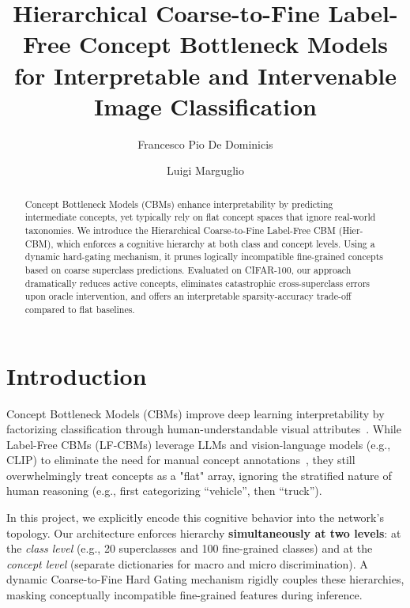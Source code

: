 \documentclass[sigconf, nonacm]{acmart}
\begin{document}
\title{Hierarchical Coarse-to-Fine Label-Free Concept Bottleneck Models for Interpretable and Intervenable Image Classification}

\author{Francesco Pio De Dominicis}

\author{Luigi Marguglio}

\begin{abstract}
Concept Bottleneck Models (CBMs) enhance interpretability by predicting intermediate concepts, yet typically rely on flat concept spaces that ignore real-world taxonomies. We introduce the Hierarchical Coarse-to-Fine Label-Free CBM (Hier-CBM), which enforces a cognitive hierarchy at both class and concept levels. Using a dynamic hard-gating mechanism, it prunes logically incompatible fine-grained concepts based on coarse superclass predictions. Evaluated on CIFAR-100, our approach dramatically reduces active concepts, eliminates catastrophic cross-superclass errors upon oracle intervention, and offers an interpretable sparsity-accuracy trade-off compared to flat baselines.
\end{abstract}

\maketitle

\section{Introduction}
Concept Bottleneck Models (CBMs) improve deep learning interpretability by factorizing classification through human-understandable visual attributes~\cite{Poeta_2023}. While Label-Free CBMs (LF-CBMs) leverage LLMs and vision-language models (e.g., CLIP) to eliminate the need for manual concept annotations~\cite{Wang_2023, Pastor_2026_tutorial}, they still overwhelmingly treat concepts as a "flat" array, ignoring the stratified nature of human reasoning (e.g., first categorizing ``vehicle'', then ``truck'').

In this project, we explicitly encode this cognitive behavior into the network's topology. Our architecture enforces hierarchy \textbf{simultaneously at two levels}: at the \textit{class level} (e.g., 20 superclasses and 100 fine-grained classes) and at the \textit{concept level} (separate dictionaries for macro and micro discrimination). A dynamic Coarse-to-Fine Hard Gating mechanism rigidly couples these hierarchies, masking conceptually incompatible fine-grained features during inference.
\end{document}
